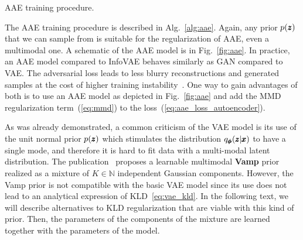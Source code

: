 \begin{algorithm}


\caption{AAE training procedure.}
\label{alg:aae}
\end{algorithm}

The AAE training procedure is described in Alg.~\ref{alg:aae}.
Again, any prior $p(\pmb{{z}})$ that we can sample from is suitable for the
regularization of AAE, even a multimodal one. A schematic of the AAE
model is in Fig.~\ref{fig:aae}. In practice, an AAE model compared
to InfoVAE behaves similarly as GAN compared to VAE. The adversarial
loss leads to less blurry reconstructions and generated samples at
the cost of higher training instability~\cite{tolstikhin2017wasserstein}.
One way to gain advantages of both is to use an AAE model as depicted
in Fig.~\ref{fig:aae} and add the MMD regularization term~(\ref{eq:mmd})
to the loss~(\ref{eq:aae_loss_autoencoder}).













As was already demonstrated, a common criticism of the VAE model is its use of the unit normal prior $p(\pmb{{z}})$ which stimulates the distribution $q_{\pmb{{\phi}}}(\pmb{{z}}|\pmb{{x}})$ to have a single mode, and therefore it is hard to fit data with a multi-modal latent distribution. The publication~\cite{tomczak2018vae} proposes a learnable multimodal \textbf{Vamp} prior realized as a mixture of $K \in \mathbb{N}$ independent Gaussian components. However, the Vamp prior is not compatible with the basic VAE model since its use does not lead to an analytical expression of KLD~\eqref{eq:vae_kld}. In the following text, we will describe alternatives to KLD regularization that are viable with this kind of prior. Then, the parameters of the components of the mixture are learned together with the parameters of the model.

